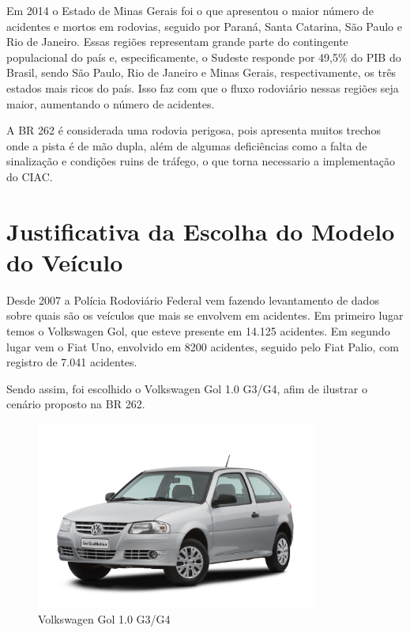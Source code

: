 Em 2014 o Estado de Minas Gerais foi o que apresentou o maior número de acidentes e mortos em rodovias, seguido por Paraná, Santa Catarina, São Paulo e Rio de Janeiro. Essas regiões representam grande parte do contingente populacional do país e, especificamente, o Sudeste responde por 49,5\% do PIB do Brasil, sendo São Paulo, Rio de Janeiro e Minas Gerais, respectivamente, os três estados mais ricos do país. Isso faz com que o fluxo rodoviário nessas regiões seja maior, aumentando o número de acidentes. 

A BR 262 é considerada uma rodovia perigosa, pois apresenta muitos trechos onde a pista é de mão dupla, além de algumas deficiências como a falta de sinalização e condições ruins de tráfego, o que torna necessario a implementação do CIAC. 

\section{Justificativa da Escolha do Modelo do Veículo}

Desde 2007 a Polícia Rodoviário Federal vem fazendo levantamento de dados sobre quais são os veículos que mais se envolvem em acidentes. Em primeiro lugar temos o Volkswagen Gol, que esteve presente em 14.125 acidentes. Em segundo lugar vem o Fiat Uno, envolvido em 8200 acidentes, seguido pelo Fiat Palio, com registro de 7.041 acidentes. 

Sendo assim, foi escolhido o  Volkswagen Gol 1.0 G3/G4, afim de ilustrar o cenário proposto na BR 262.

\begin{figure}[h!]
  \centering
  \includegraphics[width=350px, scale=1]{figuras/gol}
  \caption{Volkswagen Gol 1.0 G3/G4}
\label{fig:gol}
\end{figure}


